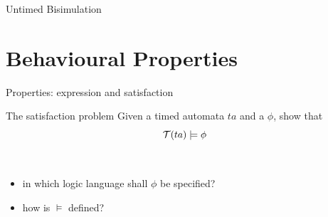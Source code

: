 \documentclass[aspectratio=169]{beamer}
\begin{document}
\begin{slide}{Untimed Bisimulation}
\small

\exerciseBack



\end{slide}
\exerciseAdd

\section{Behavioural Properties}
\begin{slide}{Properties: expression and satisfaction}
\small
\begin{block}{The satisfaction problem }
Given a \alert{timed automata} $ta$ and a  $\phi$, show that
\begin{equation*}
\mathcal{T}(ta) \models \phi
\end{equation*}
\end{block}
~\\

\pause
\begin{itemize}
\item in which logic language shall $\phi$ be specified?
\item how is $\models$ defined?
\end{itemize}
\end{slide}
\end{document}
